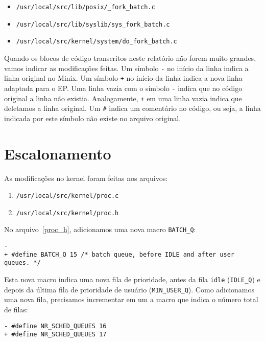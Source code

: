 \documentclass{amsart}
\theoremstyle{plain}
\newcommand{\code}[1]{\lstinline[mathescape=true]{#1}}
\begin{document}
\begin{itemize}
  \item \code{/usr/local/src/lib/posix/_fork_batch.c}
  \item \code{/usr/local/src/lib/syslib/sys_fork_batch.c}
  \item \code{/usr/local/src/kernel/system/do_fork_batch.c}
\end{itemize}

Quando os blocos de código transcritos neste relatório não forem muito grandes, vamos indicar as
modificações feitas. Um símbolo \code{-} no início da linha indica a linha original no Minix. Um
símbolo \code{+} no início da linha indica a nova linha adaptada para o EP\@. Uma linha vazia com o
símbolo \code{-} indica que no código original a linha não existia. Analogamente, \code{+} em uma
linha vazia indica que deletamos a linha original. Um \code{#} indica um comentário no código, ou
seja, a linha indicada por este símbolo não existe no arquivo original.

\section{Escalonamento}

As modificações no kernel foram feitas nos arquivos:

\begin{enumerate}
  \item\label{proc_c} \code{/usr/local/src/kernel/proc.c}
  \item\label{proc_h} \code{/usr/local/src/kernel/proc.h}
\end{enumerate}

No arquivo~\ref{proc_h}, adicionamos uma nova macro \code{BATCH_Q}:

\begin{lstlisting}[frame=leftline,mathescape=true,style=nonumbers]
-
+ #define BATCH_Q 15 /* batch queue, before IDLE and after user queues. */
\end{lstlisting}

Esta nova macro indica uma nova fila de prioridade, antes da fila \code{idle} (\code{IDLE_Q}) e
depois da última fila de prioridade de usuário (\code{MIN_USER_Q}). Como adicionamos uma nova fila,
precisamos incrementar em um a macro que indica o número total de filas:

\begin{lstlisting}[frame=leftline,mathescape=true,style=nonumbers]
- #define NR_SCHED_QUEUES 16
+ #define NR_SCHED_QUEUES 17
\end{lstlisting}
\end{document}
